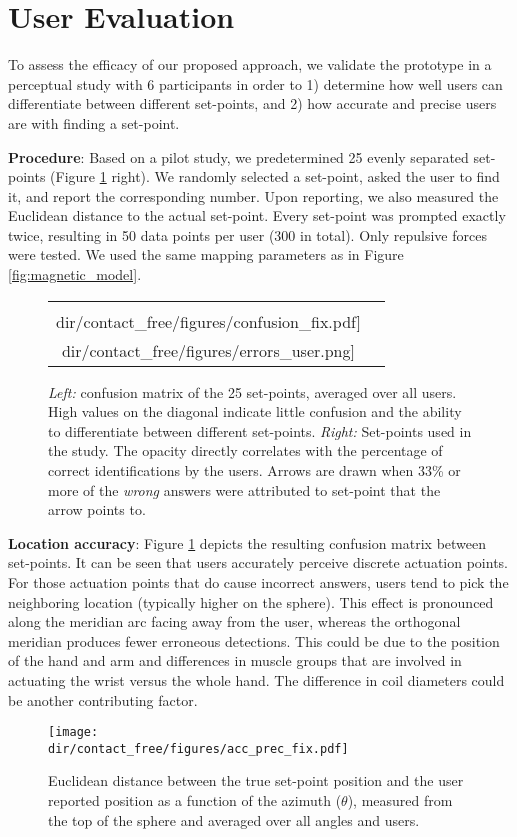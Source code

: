 \section{User Evaluation}
To assess the efficacy of our proposed approach, we validate the prototype in a perceptual study with 6 participants in order to 1) determine how well users can differentiate between different set-points, and 2) how accurate and precise users are with finding a set-point.

\noindent\textbf{Procedure}: Based on a pilot study, we predetermined 25 evenly separated set-points (Figure \ref{fig:confusion_circle_error} right). We randomly selected a set-point, asked the user to find it, and report the corresponding number. Upon reporting, we also measured the Euclidean distance to the actual set-point. Every set-point was prompted exactly twice, resulting in 50 data points per user (300 in total). Only repulsive forces were tested. We used the same mapping parameters as in Figure \ref{fig:magnetic_model}.
\begin{figure}[!t]
    \centering
    \begin{tabular}{cc}
     \texttt{[image: \\dir/contact\_free/figures/confusion\_fix.pdf]} &
    \texttt{[image: \\dir/contact\_free/figures/errors\_user.png]}
    \end{tabular}
    \caption{\emph{Left:} confusion matrix of the 25 set-points, averaged over all users. High values on the diagonal indicate little confusion and the ability to differentiate between different set-points. \emph{Right:} Set-points used in the study. The opacity directly correlates with the percentage of correct identifications by the users. Arrows are drawn when 33\% or more of the \emph{wrong} answers were attributed to set-point that the arrow points to.}
    \label{fig:confusion_circle_error}
\end{figure}

\noindent\textbf{Location accuracy}: Figure \ref{fig:confusion_circle_error} depicts the resulting confusion matrix between set-points. It can be seen that users accurately perceive discrete actuation points. For those actuation points that do cause incorrect answers, users tend to pick the neighboring location (typically higher on the sphere). This effect is pronounced along the meridian arc facing away from the user, whereas the orthogonal meridian produces fewer erroneous detections. This could be due to the position of the hand and arm and differences in muscle groups that are involved in actuating the wrist versus the whole hand. The difference in coil diameters could be another contributing factor.
\begin{figure}[!t]
    \centering
    \medskip
    \texttt{[image: \\dir/contact\_free/figures/acc\_prec\_fix.pdf]}
    \caption{Euclidean distance between the true set-point position and the user reported position as a function of the azimuth ($\theta$), measured from the top of the sphere and averaged over all angles and users.}
    \label{fig:error_vs_angle}
\end{figure}


